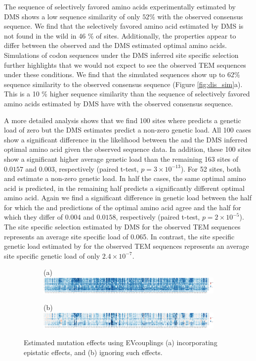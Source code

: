 \documentclass[fleqn,letterpaper]{article}
\begin{document}
The sequence of selectively favored amino acids experimentally estimated by DMS shows a low sequence similarity of only $52 \%$ with the observed consensus sequence. 
We find that the selectively favored amino acid estimated by DMS is not found in the wild in 46 \% of sites.
Additionally, the \PC properties appear to differ between the observed and the DMS estimated optimal amino acids.
Simulations of codon sequences under the DMS inferred site specific selection further highlights that we would not expect to see the observed TEM sequences under these conditions.
We find that the simulated sequences show up to $62 \%$ sequence similarity to the observed consensus sequence (Figure \ref{fig:dis_sim}a).
This is a 10 \% higher sequence similarity than the sequence of selectively favored amino acids estimated by DMS have with the observed consensus sequence. 

A more detailed analysis shows that we find 100 sites where \selac predicts a genetic load of zero but the DMS estimates predict a non-zero genetic load.
All 100 cases show a significant difference in the likelihood between the \selac and the DMS inferred optimal amino acid given the observed sequence data.
In addition, these 100 sites show a significant higher average genetic load than the remaining 163 sites of $0.0157$ and $0.003$, respectively (paired t-test, $p = 3\times10^{-13}$).
For 52 sites, both \phydms and \selac estimate a non-zero genetic load.
In half the cases, the same optimal amino acid is predicted, in the remaining half \phydms predicts a significantly different optimal amino acid.
Again we find a significant difference in genetic load between the half for which the \selac and \phydms predictions of the optimal amino acid agree and the half for which they differ of $0.004$ and $0.0158$, respectively (paired t-test, $p = 2\times 10^{-5}$).
The site specific selection estimated by DMS for the observed TEM sequences represents an average site specific load of 0.065.
In contrast, the site specific genetic load estimated by \selac for the observed TEM sequences represents an average site specific genetic load of only $2.4\times 10^{-7}$.


\begin{figure}
    \centering
    \begin{subfigure}
        \centering
        (a)\includegraphics[width=\textwidth]{img/BLAT_ECOLX_b04_epistatic_model.pdf}
    \end{subfigure}
    \begin{subfigure}
        \centering
        (b)\includegraphics[width=\textwidth]{img/BLAT_ECOLX_b04_independent_model.pdf}
    \end{subfigure}
    \caption{Estimated mutation effects using EVcouplings (a) incorporating epistatic effects, and (b) ignoring such effects.}
    \label{fig:evcoupl}
\end{figure}
\end{document}
